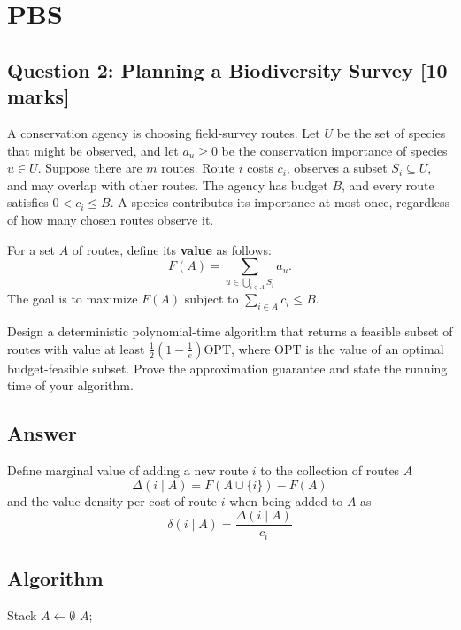 \documentclass[10pt]{article}
\theoremstyle{definition}
\begin{document}
\section{PBS}
\subsection*{Question 2: Planning a Biodiversity Survey [10 marks]}

A conservation agency is choosing field-survey routes. Let $U$ be the set of species that might be
observed, and let $a_u\geq 0$ be the conservation importance of species $u\in U$. Suppose there are $m$
routes. Route $i$ costs $c_i$, observes a subset $S_i\subseteq U$, and may overlap with other routes. The agency
has budget $B$, and every route satisfies $0<c_i\leq B$. A species contributes its importance at most
once, regardless of how many chosen routes observe it.

For a set $A$ of routes, define its \textbf{value} as follows:
\[
F(A)=\sum_{u\in\bigcup_{i\in A}S_i}a_u.
\]
The goal is to maximize $F(A)$ subject to $\sum_{i\in A}c_i\leq B$.

Design a deterministic polynomial-time algorithm that returns a feasible subset of routes with value
at least $\frac12\left(1-\frac1e\right)\mathrm{OPT}$, where $\mathrm{OPT}$ is the value of an optimal budget-feasible subset. Prove the
approximation guarantee and state the running time of your algorithm.

\subsection*{Answer}
Define marginal value of adding a new route $i$ to the collection of routes $A$  
\[\Delta(i\mid A) = F(A \cup \{i\}) - F(A)\]
and the value density per cost of route $i$ when being added to $A$ as
\[\delta(i\mid A) = \frac{\Delta (i \mid A)}{c_i}\]
\subsection{Algorithm}
\begin{algorithm}[H]
  Stack $A \gets \emptyset$\;
  \Return $A$;
\end{algorithm}
\end{document}

